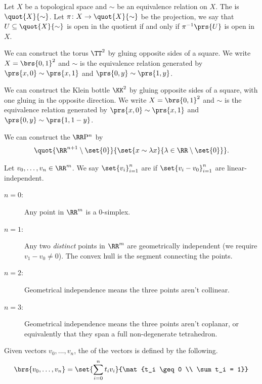 \documentclass[10pt,a4paper,twoside,openany,hidelinks]{book}
\begin{document}
\begin{definition}
Let $X$ be a topological space and $\sim$ be an equivalence relation on $X$.
The  is $\quot{X}{\sim}$. Let $\pi \colon X \to \quot{X}{\sim}$ be the projection, we say that $U \subseteq \quot{X}{\sim}$ is open in the quotient if and only if $\pi^{-1}\prs{U}$ is open in $X$.
\end{definition}
\begin{example}
We can construct the torus $\TT^2$ by gluing opposite sides of a square.
We write $X = \brs{0,1}^{2}$ and $\sim$ is the equivalence relation generated by $\prs{x,0} \sim \prs{x,1}$ and $\prs{0,y} \sim \prs{1,y}$.
\end{example}
\begin{example}
We can construct the Klein bottle $\KK^2$ by gluing opposite sides of a square, with one gluing in the opposite direction.
We write $X = \brs{0,1}^{2}$ and $\sim$ is the equivalence relation generated by $\prs{x,0} \sim \prs{x,1}$ and $\prs{0,y} \sim \prs{1,1-y}$.
\end{example}
\begin{example}
We can construct the  $\RR \mathrm{P}^n$ by \[\quot{\RR^{n+1}\setminus\set{0}}{\set{x \sim \lambda x}{\lambda \in \RR\setminus\set{0}}}\text{.}\]
\end{example}
\begin{definition}
Let $v_0, \ldots, v_n \in \RR^m$. We say $\set{v_i}_{i=1}^{n}$ are  if $\set{v_i - v_0}_{i=1}^n$ are linear-independent.
\end{definition}
\begin{example}
\begin{description}
\item[$n=0$:] Any point in $\RR^m$ is a $0$-simplex.
\item[$n=1$:] Any two \emph{distinct} points in $\RR^m$ are geometrically independent (we require $v_1 - v_0 \neq 0$). The convex hull is the segment connecting the points.
\item[$n=2$:] Geometrical independence means the three points aren't collinear.
\item[$n=3$:] Geometrical independence means the three points aren't coplanar, or equivalently that they span a full non-degenerate tetrahedron.
\end{description}
\end{example}
\begin{definition}
Given vectors $v_0, \ldots, v_n$, the  of the vectors is defined by the following.
\[\brs{v_0, \ldots, v_n} = \set{\sum_{i=0}^n t_i v_i}{\mat{t_i \geq 0 \\ \sum t_i = 1}}\]
\end{definition}
\end{document}
